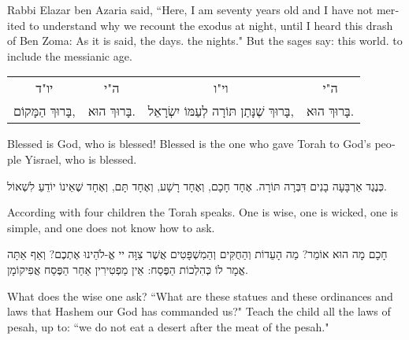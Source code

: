 \begin{english}
Rabbi Elazar ben Azaria said, ``Here, I am seventy years old and I have not merited to understand why we recount the exodus at night, until I heard this drash of Ben Zoma: As it is said,   the days.  the nights." But the sages say:  this world.  to include the messianic age.
\end{english}

\vspace{1em}

\begin{tabular}{c c c c}
{\small \instructionfont
יו"ד
} & {\small \instructionfont
ה"י
} & {\small \instructionfont
וי"ו
} & {\small \instructionfont
ה"י 
} \\
בָּרוּךְ הַמָּקוֹם, 
& בָּרוּךְ הוּא. 
& בָּרוּךְ שֶׁנָּתַן תּוֹרָה לְעַמּוֹ יִשְׂרָאֵל, 
& בָּרוּךְ הוּא. \\
\end{tabular}

\begin{english}
Blessed is God, who is blessed! Blessed is the one who gave Torah to God's people Yisrael, who is blessed.
\end{english}

\break

כְּנֶגֶד אַרְבָּעָה בָנִים דִּבְּרָה תּוֹרָה. אֶחָד חָכָם, וְאֶחָד רָשָׁע, וְאֶחָד תָּם, וְאֶחָד שֶׁאֵינוֹ יוֹדֵעַ לִשְׁאוֹל.

\begin{english}
According with four children the Torah speaks. One is wise, one is wicked, one is simple, and one does not know how to ask.
\end{english}

חָכָם מָה הוּא אוֹמֵר? מַה הָעֵדוֹת וְהַחֻקִּים וְהַמִשְׁפָּטִים אֲשֶׁר צִוָּה יי אֱ-לֹהֵינוּ אֶתְכֶם? וְאַף אַתָּה אֱמָר לוֹ כְּהִלְכוֹת הַפֶּסַח: אֵין מַפְטִירִין אַחַר הַפֶּסַח אֲפִיקוֹמָן.

\begin{english}
What does the wise one ask? ``What are these statues and these ordinances and laws that Hashem our God has commanded us?" Teach the child all the laws of pesah, up to: ``we do not eat a desert after the meat of the pesah."
\end{english}

